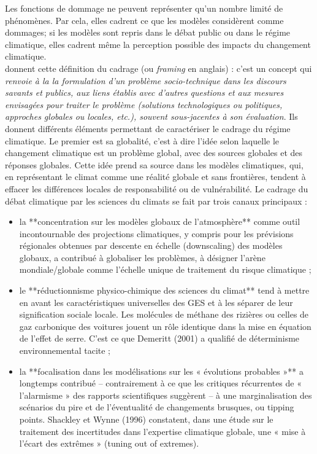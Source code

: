 Les fonctions de dommage ne peuvent représenter qu'un nombre limité de phénomènes. Par cela, elles cadrent ce que les modèles considèrent comme dommages; si les modèles sont repris dans le débat public ou dans le régime climatique, elles cadrent même la perception possible des impacts du changement climatique. \\

\cite{aykut_gouverner_nodate} donnent cette définition du cadrage (ou \emph{framing} en anglais) : c'est un concept qui  \emph{renvoie à la la formulation d’un problème socio-technique dans les discours savants et publics, aux liens établis avec d’autres questions et aux mesures envisagées pour traiter le problème (solutions technologiques ou politiques, approches globales ou locales, etc.), souvent sous-jacentes à son évaluation}. Ils donnent différents éléments permettant de caractériser le cadrage du régime climatique. Le premier est sa globalité, c'est à dire l'idée selon laquelle le changement climatique est un problème global, avec des sources globales et des réponses globales. Cette idée prend sa source dans les modèles climatiques, qui, en représentant le climat comme une réalité globale et sans frontières, tendent à effacer les différences locales de responsabilité ou de vulnérabilité. Le cadrage du débat climatique par les sciences du climats se fait par trois canaux principaux : 



\begin{displayquote}
\begin{itemize}
    \item la **concentration sur les modèles globaux de l’atmosphère** comme outil incontournable des projections climatiques, y compris pour les prévisions régionales obtenues par descente en échelle (downscaling) des modèles globaux, a contribué à globaliser les problèmes, à désigner l’arène mondiale/globale comme l’échelle unique de traitement du risque climatique ;
	\item le **réductionnisme physico-chimique des sciences du climat** tend à mettre en avant les caractéristiques universelles des GES et à les séparer de leur signification sociale locale. Les molécules de méthane des rizières ou celles de gaz carbonique des voitures jouent un rôle identique dans la mise en équation de l’effet de serre. C’est ce que Demeritt (2001) a qualifié de déterminisme environnemental tacite ;
	\item la **focalisation dans les modélisations sur les « évolutions probables »** a longtemps contribué – contrairement à ce que les critiques récurrentes de « l’alarmisme » des rapports scientifiques suggèrent – à une marginalisation des scénarios du pire et de l’éventualité de changements brusques, ou tipping points. Shackley et Wynne (1996) constatent, dans une étude sur le traitement des incertitudes dans l’expertise climatique globale, une « mise à l’écart des extrêmes » (tuning out of extremes).
\end{itemize}
\end{displayquote}

